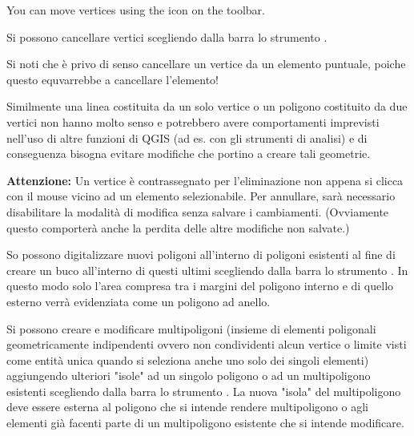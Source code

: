 
You can move vertices using the  icon
on the toolbar.


Si possono cancellare vertici scegliendo dalla barra lo strumento .

Si noti che è privo di senso cancellare un vertice da un elemento puntuale,
poiche questo equvarrebbe a cancellare l'elemento!

Similmente una linea costituita da un solo vertice o un poligono costituito da
due vertici non hanno molto senso e potrebbero avere comportamenti imprevisti
nell'uso di altre funzioni di QGIS (ad es. con gli strumenti di analisi) e di
conseguenza bisogna evitare modifiche che portino a creare tali geometrie.

\textbf{Attenzione:} Un vertice è contrassegnato per l'eliminazione non appena
si clicca con il mouse vicino ad un elemento selezionabile. Per annullare,
sarà necessario disabilitare la modalità di modifica senza salvare i
cambiamenti. (Ovviamente questo comporterà anche la perdita delle altre
modifiche non salvate.)


So possono digitalizzare nuovi poligoni all'interno di poligoni esistenti al fine
di creare un buco all'interno di questi ultimi scegliendo dalla barra lo
strumento .
In questo modo solo l'area compresa tra i margini del poligono interno e di
quello esterno verrà evidenziata come un poligono ad anello. 


Si possono creare e modificare multipoligoni (insieme di elementi poligonali
geometricamente indipendenti ovvero non condividenti alcun vertice o limite
visti come entità unica quando si seleziona anche uno solo dei singoli
elementi) aggiungendo ulteriori "isole" ad
un singolo poligono o ad un multipoligono esistenti scegliendo dalla barra lo
strumento . La nuova "isola"
del multipoligono deve essere esterna al poligono che si intende rendere
multipoligono o agli elementi già facenti parte di un multipoligono esistente
che si intende modificare. 

